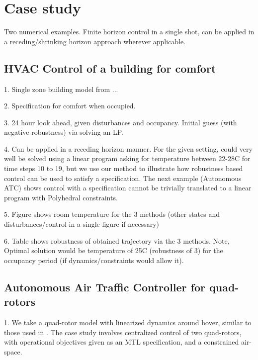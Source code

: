 \section{Case study}
\label{sec:case study}
Two numerical examples. Finite horizon control in a single shot, can be applied in a receding/shrinking horizon approach wherever applicable. 


\subsection{HVAC Control of a building for comfort}
1. Single zone building model from ...

2. Specification for comfort when occupied.

3. 24 hour look ahead, given disturbances and occupancy. Initial guess (with negative robustness) via solving an LP.

4. Can be applied in a receding horizon manner. For the given setting, could very well be solved using a linear program asking for temperature between 22-28C for time steps 10 to 19, but we use our method to illustrate how robustness based control can be used to satisfy a specification. The next example (Autonomous ATC) shows control with a specification cannot be trivially translated to a linear program with Polyhedral constraints.

5. Figure shows room temperature for the 3 methods (other states and disturbances/control in a single figure if necessary)

6. Table shows robustness of obtained trajectory via the 3 methods. Note, Optimal solution would be temperature of 25C  (robustness of 3) for the occupancy period (if dynamics/constraints would allow it).



\subsection{Autonomous Air Traffic Controller for quad-rotors}
1. We take a quad-rotor model with linearized dynamics around hover, similar to those used in \cite{}. The case study involves centralized control of two quad-rotors, with operational objectives given as an MTL specification, and a constrained air-space.


